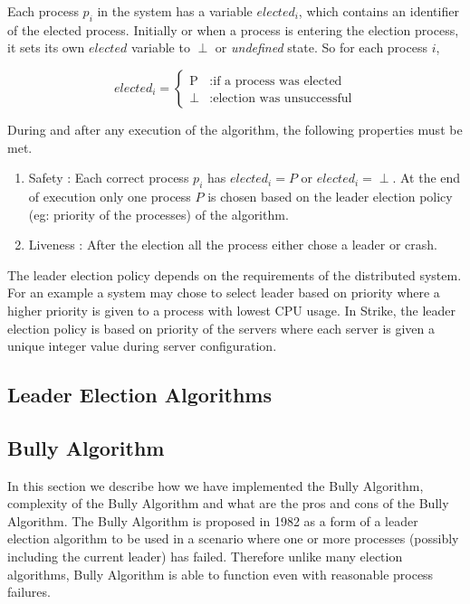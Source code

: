 \documentclass[dareport.tex]{subfiles}
\begin{document}
Each process $p_i$ in the system has a variable $elected_i$, which contains an identifier of the elected process. Initially or when a process is entering the election process, it sets its own $elected$ variable to $\perp$ or \emph{undefined} state. So for each process $i$,

\begin{equation*}
	elected_i =
		\begin{cases}
			\text{P} &: \text{if a process was elected}\\
			\text{$\perp$} &: \text{election was unsuccessful}
		\end{cases}
\end{equation*}

During and after any execution of the algorithm, the following properties must be met.
\begin{enumerate}
\item Safety : Each correct process $p_i$ has $elected_i = P$ or $elected_i = \perp$. At the end of execution only one process $P$ is chosen based on the leader election policy (eg: priority of the processes) of the algorithm.
\item Liveness : After the election all the process either chose a leader or crash.
\end{enumerate}

The leader election policy depends on the requirements of the distributed system. For an example a system may chose to select leader based on priority where a higher priority is given to a process with lowest CPU usage. In Strike, the leader election policy is based on priority of the servers where each server is given a unique integer value during server configuration.
\subsection{Leader Election Algorithms}
\subsection{Bully Algorithm} \label{ssec:bully}
In this section we describe how we have implemented the Bully Algorithm, complexity of the Bully Algorithm and what are the pros and cons of the Bully Algorithm. The Bully Algorithm\cite{election} is proposed in 1982 as a form of a leader election algorithm to be used in a scenario where one or more processes (possibly including the current leader) has failed. Therefore unlike many election algorithms, Bully Algorithm is able to function even with reasonable process failures.
\end{document}
